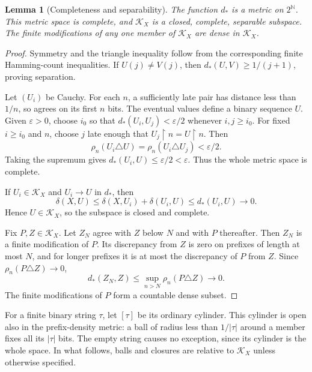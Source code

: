 \documentclass[11pt,a4paper]{article}
\newcommand{\N}{\mathbb N}
\newcommand{\Cantor}{2^{\N}}
\newcommand{\dst}{d_{\!*}}
\newtheorem{lemma}[theorem]{Lemma}
\theoremstyle{definition}\newtheorem{definition}[theorem]{Definition}
\theoremstyle{remark}\newtheorem{remark}[theorem]{Remark}
\begin{document}
\begin{lemma}[Completeness and separability]\label{lem:complete}
The function $\dst$ is a metric on $\Cantor$. This metric space is complete, and $\mathcal K_X$ is a closed, complete, separable subspace. The finite modifications of any one member of $\mathcal K_X$ are dense in $\mathcal K_X$.
\end{lemma}
\begin{proof}
Symmetry and the triangle inequality follow from the corresponding finite Hamming-count inequalities. If $U(j)\ne V(j)$, then $\dst(U,V)\ge1/(j+1)$, proving separation.

Let $(U_i)$ be Cauchy. For each $n$, a sufficiently late pair has distance less than $1/n$, so agrees on its first $n$ bits. The eventual values define a binary sequence $U$. Given $\varepsilon>0$, choose $i_0$ so that $\dst(U_i,U_j)<\varepsilon/2$ whenever $i,j\ge i_0$. For fixed $i\ge i_0$ and $n$, choose $j$ late enough that $U_j\upharpoonright n=U\upharpoonright n$. Then
\[
 \rho_n(U_i\triangle U)=\rho_n(U_i\triangle U_j)<\varepsilon/2.
\]
Taking the supremum gives $\dst(U_i,U)\le\varepsilon/2<\varepsilon$. Thus the whole metric space is complete.

If $U_i\in\mathcal K_X$ and $U_i\to U$ in $\dst$, then
\[
 \delta(X,U)\le\delta(X,U_i)+\delta(U_i,U)
                   \le\dst(U_i,U)\longrightarrow0.
\]
Hence $U\in\mathcal K_X$, so the subspace is closed and complete.

Fix $P,Z\in\mathcal K_X$. Let $Z_N$ agree with $Z$ below $N$ and with $P$ thereafter. Then $Z_N$ is a finite modification of $P$. Its discrepancy from $Z$ is zero on prefixes of length at most $N$, and for longer prefixes it is at most the discrepancy of $P$ from $Z$. Since $\rho_n(P\triangle Z)\to0$,
\[
 \dst(Z_N,Z)\le\sup_{n>N}\rho_n(P\triangle Z)\longrightarrow0.
\]
The finite modifications of $P$ form a countable dense subset.
\end{proof}

For a finite binary string $\tau$, let $[\tau]$ be its ordinary cylinder. This cylinder is open also in the prefix-density metric: a ball of radius less than $1/|\tau|$ around a member fixes all its $|\tau|$ bits. The empty string causes no exception, since its cylinder is the whole space. In what follows, balls and closures are relative to $\mathcal K_X$ unless otherwise specified.
\end{document}
